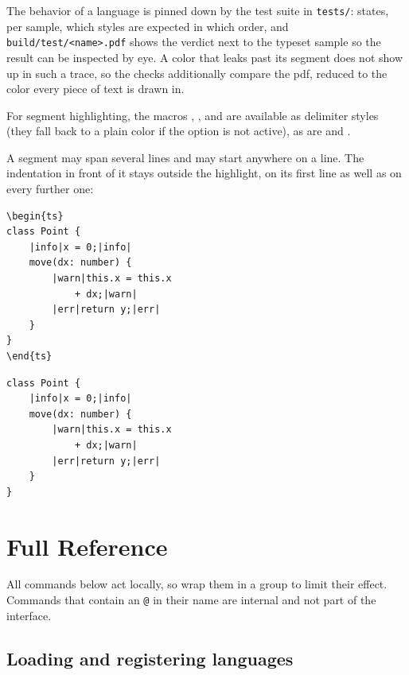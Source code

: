 \documentclass[a4paper,10pt,parskip=half,numbers=noenddot]{scrartcl}
\let\T\texttt
\def\argref#1#2{\CodeLinkRef[group=opt]{#1}}
\begin{document}
The behavior of a language is pinned down by the test suite in \T{tests/}:
 states, per sample, which styles are expected in which
order, and \T{build/test/<name>.pdf} shows the verdict next to the typeset
sample so the result can be inspected by eye. A color that leaks past its
segment does not show up in such a trace, so the checks additionally compare
the pdf, reduced to the color every piece of text is drawn in.

For segment highlighting, the macros \blatex{\\xlsthlwarning},
\blatex{\\xlsthlerror}, and \blatex{\\xlsthlinfo} are available as delimiter
styles (they fall back to a plain color if the \argref{highlights}{highlights}
option is not active), as are  and
.

A segment may span several lines and may start anywhere on a line. The
indentation in front of it stays outside the highlight, on its first line as
well as on every further one:

\begin{verbatim}
\begin{ts}
class Point {
    |info|x = 0;|info|
    move(dx: number) {
        |warn|this.x = this.x
            + dx;|warn|
        |err|return y;|err|
    }
}
\end{ts}
\end{verbatim}

\begin{verbatim}
class Point {
    |info|x = 0;|info|
    move(dx: number) {
        |warn|this.x = this.x
            + dx;|warn|
        |err|return y;|err|
    }
}
\end{verbatim}

\section{Full Reference}\label{sec:full-reference}

All commands below act locally, so wrap them in a group to limit their effect.
Commands that contain an \T{@} in their name are internal and not part of the interface.

\subsection*{Loading and registering languages}
\end{document}
